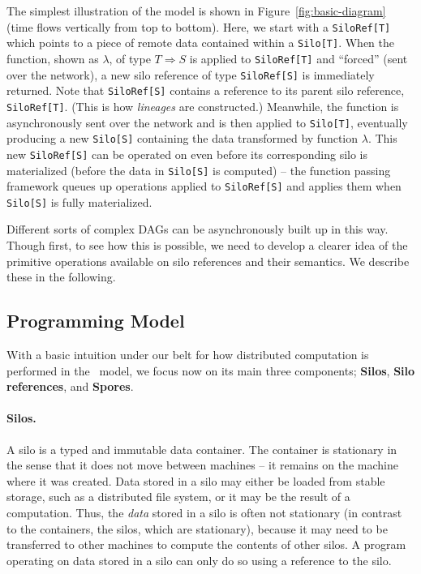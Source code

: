 \documentclass{jfp1}
\begin{document}
The simplest illustration of the model is shown in
Figure~\ref{fig:basic-diagram} (time flows vertically from top to bottom). Here,
we start with a \verb|SiloRef[T]| which points to a piece of remote data
contained within a \verb|Silo[T]|. When the function, shown as $\lambda$, of
type $T \Rightarrow S$ is applied to \verb|SiloRef[T]| and ``forced'' (sent over
the network), a new silo reference of type \verb|SiloRef[S]| is immediately
returned. Note that \verb|SiloRef[S]| contains a reference to its parent silo
reference, \verb|SiloRef[T]|. (This is how {\em lineages} are constructed.)
Meanwhile, the function is asynchronously sent over the network and is then applied
to \verb|Silo[T]|, eventually producing a new \verb|Silo[S]| containing the data
transformed by function $\lambda$. This new \verb|SiloRef[S]| can be operated on
even before its corresponding silo is materialized (\ie before the data in
\verb|Silo[S]| is computed) – the function passing framework queues up
operations applied to \verb|SiloRef[S]| and applies them when \verb|Silo[S]| is
fully materialized.

Different sorts of complex DAGs can be asynchronously built up in this way.
Though first, to see how this is possible, we need to develop a clearer idea of
the primitive operations available on silo references and their semantics. We
describe these in the following.


\subsection{Programming Model}
\label{sec:programming-model}

With a basic intuition under our belt for how distributed computation is 
performed in the \FP~model, we focus now on its main three components; 
\textbf{Silos}, \textbf{Silo references}, and \textbf{Spores}.


\paragraph{Silos.}

A silo is a typed and immutable data container. The container is
stationary in the sense that it does not move between machines -- it
remains on the machine where it was created. Data stored in a silo may
either be loaded from stable storage, such as a distributed file
system, or it may be the result of a computation. Thus, the {\em data}
stored in a silo is often not stationary (in contrast to the
containers, the silos, which are stationary), because it may need to
be transferred to other machines to compute the contents of other
silos. A program operating on data stored in a silo can only do so
using a reference to the silo.
\end{document}
